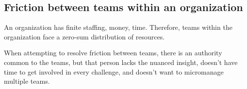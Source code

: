 \subsection{Friction between teams within an organization}
An organization has finite staffing, money, time. Therefore, teams within the organization face a zero-sum distribution of resources.

When attempting to resolve friction between teams, there is an authority common to the teams, but that person lacks the nuanced insight, doesn't have time to get involved in every challenge, and doesn't want to micromanage multiple teams.
